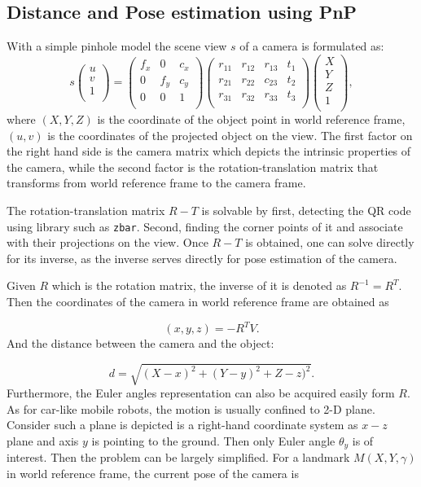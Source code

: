 \documentclass[12pt]{article}
\begin{document}
\subsection{Distance and Pose estimation using PnP}
\label{PnP}
\label{pose}
With a simple pinhole model the scene view $s$ of a camera is formulated as:
$$
s
\begin{pmatrix}
u \\
v \\
1 \\
\end{pmatrix}
=
\begin{pmatrix}
f_x & 0 & c_x \\
0  & f_y &c_y \\
0 & 0 & 1\\
\end{pmatrix}
\begin{pmatrix}
r_{11} & r_{12} & r_{13} & t_1\\
r_{21}  & r_{22} &c_{23} & t_2\\
r_{31} & r_{32} & r_{33} & t_3\\
\end{pmatrix}
\begin{pmatrix}
X \\
Y\\
Z \\
1\\
\end{pmatrix},
$$
where $(X,Y,Z)$ is the coordinate of the object point in world reference frame, $(u,v)$ is the coordinates of the projected object on the view. The first factor on the right hand side is the camera matrix which depicts the intrinsic properties of the camera, while the second factor is the rotation-translation matrix that transforms from world reference frame to the camera frame.

The rotation-translation matrix $R-T$ is solvable by first, detecting the QR code using library such as \texttt{zbar}. Second,  finding the corner points of it and associate with their projections on the view. Once $R-T$ is obtained, one can solve directly for its inverse, as the inverse serves directly for pose estimation of the camera. 

Given $R$ which is the rotation matrix, the inverse of it is denoted as $R^{-1}=R^{T}$. Then the coordinates of the camera in world reference frame are obtained as 

$$(x,y,z)=-R^T V.$$
And the distance between the camera and the object:

$$d=\sqrt{(X-x)^2+(Y-y)^2+Z-z)^2}.$$
Furthermore, the Euler angles representation can also be acquired easily form $R$. As for car-like mobile robots, the motion is usually confined to 2-D plane. Consider such a plane is depicted is a right-hand coordinate system as $x-z$ plane and axis $y$ is pointing to the ground.  Then only Euler angle $ \theta_y$ is of interest. Then the problem can be largely simplified.  For a landmark $M(X,Y,\gamma)$ in world reference frame, the current pose of the camera is 
\end{document}
